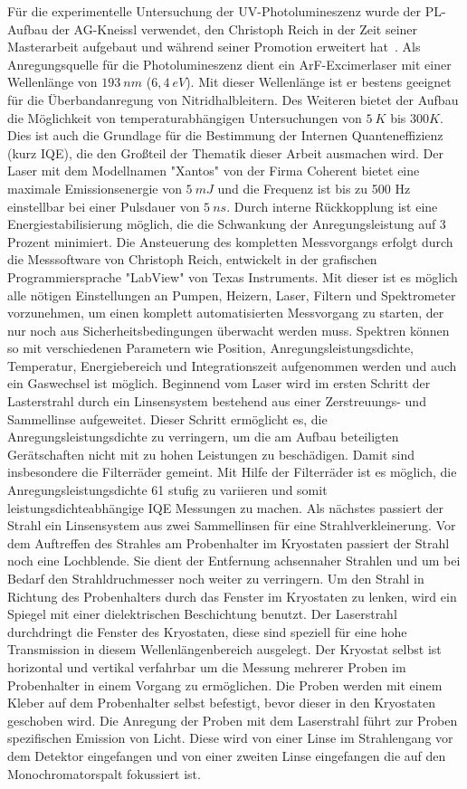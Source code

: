 Für die experimentelle Untersuchung der UV-Photolumineszenz wurde der PL-Aufbau der AG-Kneissl verwendet, den Christoph Reich in der Zeit seiner Masterarbeit aufgebaut und während seiner Promotion erweitert hat~\cite{creich}. 
Als Anregungsquelle für die Photolumineszenz dient ein ArF-Excimerlaser mit einer Wellenlänge von $193 \ nm$ ($6,4 \ eV$). Mit dieser Wellenlänge ist er bestens geeignet für die Überbandanregung von Nitridhalbleitern. 
Des Weiteren bietet der Aufbau die Möglichkeit von temperaturabhängigen Untersuchungen von $5 \ K $ bis $300 K$. Dies ist auch die Grundlage für die Bestimmung der Internen Quanteneffizienz (kurz IQE), die den Großteil der Thematik dieser Arbeit ausmachen wird. 
\newline
Der Laser mit dem Modellnamen  "Xantos" von der Firma Coherent bietet eine maximale Emissionsenergie von $ 5 \ mJ $ und die Frequenz ist bis zu 500 Hz einstellbar bei einer Pulsdauer von $5 \ ns$. 
Durch interne Rückkopplung ist eine Energiestabilisierung möglich, die die Schwankung der Anregungsleistung auf 3 Prozent minimiert. 
\newline
Die Ansteuerung des kompletten Messvorgangs erfolgt durch die Messsoftware von Christoph Reich, entwickelt in der grafischen Programmiersprache "LabView" von Texas Instruments. Mit dieser ist es möglich alle nötigen Einstellungen an Pumpen, Heizern, Laser, Filtern und Spektrometer vorzunehmen, um einen komplett automatisierten Messvorgang zu starten, der nur noch aus Sicherheitsbedingungen überwacht werden muss. Spektren können so mit verschiedenen Parametern wie Position, Anregungsleistungsdichte, Temperatur, Energiebereich und Integrationszeit aufgenommen werden und auch ein Gaswechsel ist möglich.
\newline
Beginnend vom Laser wird im ersten Schritt der Lasterstrahl durch ein Linsensystem bestehend aus einer Zerstreuungs- und Sammellinse aufgeweitet. Dieser Schritt ermöglicht es, die Anregungsleistungsdichte zu verringern, um die am Aufbau beteiligten Gerätschaften nicht mit zu hohen Leistungen zu beschädigen. Damit sind insbesondere die Filterräder gemeint. Mit Hilfe der Filterräder ist es möglich, die Anregungsleistungsdichte 61 stufig zu variieren und somit leistungsdichteabhängige IQE Messungen zu machen. Als nächstes passiert der Strahl ein Linsensystem aus zwei Sammellinsen für eine Strahlverkleinerung. Vor dem Auftreffen des Strahles am Probenhalter im Kryostaten passiert der Strahl noch eine Lochblende. Sie dient der Entfernung achsennaher Strahlen und um bei Bedarf den Strahldruchmesser noch weiter zu verringern. Um den Strahl in Richtung des Probenhalters durch das Fenster im Kryostaten zu lenken, wird ein Spiegel mit einer dielektrischen Beschichtung benutzt. Der Laserstrahl durchdringt die Fenster des Kryostaten, diese sind speziell für eine hohe Transmission in diesem Wellenlängenbereich ausgelegt. Der Kryostat selbst ist horizontal und vertikal verfahrbar um die Messung mehrerer Proben im Probenhalter in einem Vorgang zu ermöglichen. Die Proben werden mit einem Kleber auf dem Probenhalter selbst befestigt, bevor dieser in den Kryostaten geschoben wird. 
Die Anregung der Proben mit dem Laserstrahl führt zur Proben spezifischen Emission von Licht. Diese wird von einer Linse im Strahlengang vor dem Detektor eingefangen und von einer zweiten Linse eingefangen die auf den Monochromatorspalt fokussiert ist.

